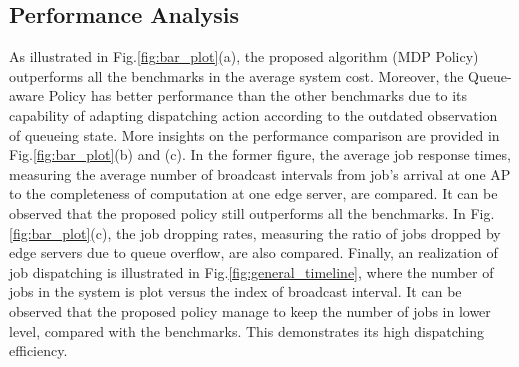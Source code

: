 \subsection{Performance Analysis}
\label{subsec:basic}

As illustrated in Fig.\ref{fig:bar_plot}(a), the proposed algorithm (MDP Policy) outperforms all the benchmarks in the average system cost.
Moreover, the Queue-aware Policy has better performance than the other benchmarks due to its capability of adapting dispatching action according to the outdated observation of queueing state.
More insights on the performance comparison are provided in Fig.\ref{fig:bar_plot}(b) and (c).
In the former figure, the average job response times, measuring the average number of broadcast intervals from job's arrival at one AP to the completeness of computation at one edge server, are compared.
It can be observed that the proposed policy still outperforms all the benchmarks.
In Fig.\ref{fig:bar_plot}(c), the job dropping rates, measuring the ratio of jobs dropped by edge servers due to queue overflow, are also compared.
Finally, an realization of job dispatching is illustrated in Fig.\ref{fig:general_timeline}, where the number of jobs in the system is plot versus the index of broadcast interval.
It can be observed that the proposed policy manage to keep the number of jobs in lower level, compared with the benchmarks.
This demonstrates its high dispatching efficiency.

